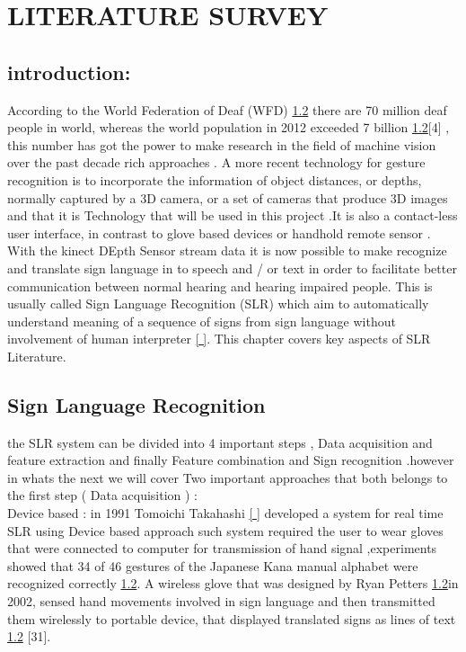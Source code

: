

\chapter{LITERATURE SURVEY}

\section{introduction:}

According to the World Federation of Deaf (WFD) \ref{} there are 70 million deaf people in world, whereas the world population in 2012 exceeded 7 billion \ref{}[4] , this number has got the power to make research in the field of machine vision  over  the  past  decade rich  approaches .
A  more  recent   technology  for gesture   recognition  is to  incorporate   the  information   of object   distances,   or depths,   normally   captured   by a 3D camera,   or a set  of cameras  that  produce 3D images and that it is Technology that will be used in this project  .It is also a contact-less  user interface,   in contrast   to glove based   devices  or handhold   remote  sensor .
With the kinect DEpth Sensor stream data it is now possible to make recognize and  translate sign language in to speech and / or text in order to facilitate better communication between normal hearing and hearing impaired people. This is usually called Sign Language Recognition (SLR) which  aim  to automatically understand meaning of a sequence of signs from sign language without involvement of human interpreter \ref{ }. This chapter covers key aspects of SLR Literature.

\section{ Sign  Language Recognition}  

the SLR system can be divided into 4 important  steps , Data acquisition and feature extraction and finally Feature combination and Sign recognition .however in whats the next  we will cover Two important approaches that both  belongs to the first step ( Data acquisition ) :\\

Device based :
in  1991 Tomoichi Takahashi  \ref{ } developed a system for real time SLR  using Device based approach such system required the user to wear gloves that were connected to computer for transmission of hand signal ,experiments showed that 34 of 46 gestures of the Japanese Kana manual alphabet were recognized correctly \ref{}.
 A wireless glove that was designed by Ryan Petters  \ref{}in 2002, sensed hand movements involved in sign language and then transmitted them wirelessly to portable device, that displayed translated signs as lines of text \ref{} [31].
 

